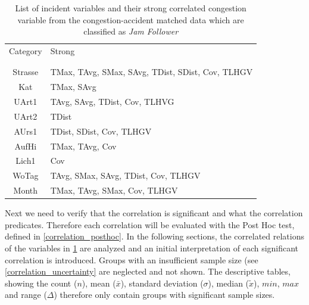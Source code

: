 \noindent
\begin{table}[h!]
	\centering
	\begin{tabular}{c|l}  
		Category & Strong \\
		\\[-1em]
		\hline
		\\[-1em]
		Strasse & TMax, TAvg, SMax, SAvg, TDist, SDist, Cov, TLHGV \\ 
 		Kat & TMax, SAvg \\ %
 		UArt1 & TAvg, SAvg, TDist, Cov, TLHVG \\ %
 		UArt2 & TDist \\ %
 		AUrs1 & TDist, SDist, Cov, TLHGV \\ %
 		AufHi & TMax, TAvg, Cov \\ %
 		Lich1 & Cov \\ %
 		WoTag & TAvg, SMax, SAvg, TDist, Cov, TLHGV \\ %
 		Month & TMax, TAvg, SMax, Cov, TLHGV \\ %
	\end{tabular}
    \caption{List of incident variables and their strong correlated congestion variable from the congestion-accident matched data which are classified as \textit{Jam Follower}}
	\label{tbl:correlation_list_baysis_follower}
\end{table}

Next we need to verify that the correlation is significant and what the correlation predicates. Therefore each correlation will be evaluated with the Post Hoc test, defined in \cref{correlation_posthoc}. In the following sections, the correlated relations of the variables in \cref{tbl:correlation_list_baysis_follower} are analyzed and an initial interpretation of each significant correlation is introduced. Groups with an insufficient sample size (see \cref{correlation_uncertainty} are neglected and not shown. The descriptive tables, showing the count ($n$), mean ($\bar{x}$), standard deviation ($\sigma$), median ($\tilde{x}$), $min$, $max$ and range ($\Delta$) therefore only contain groups with significant sample sizes.

